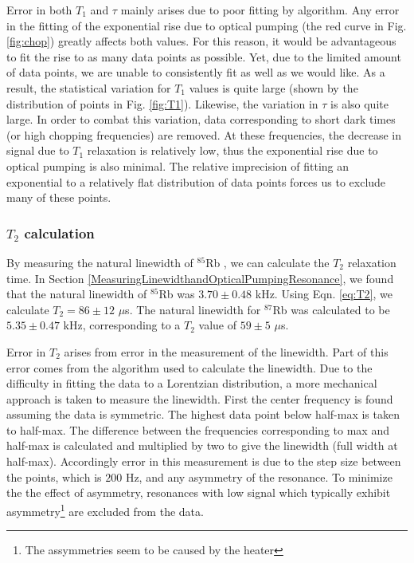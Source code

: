 Error in both $T_1$ and $\tau$ mainly arises due to poor fitting by algorithm.  Any error in the fitting of the exponential rise due to optical pumping (the red curve in Fig. \ref{fig:chop}) greatly affects both values.  For this reason, it would be advantageous to fit the rise to as many data points as possible. Yet, due to the limited amount of data points, we are unable to consistently fit as well as we would like.  As a result, the statistical variation for $T_1$ values is quite large (shown by the distribution of points in Fig. \ref{fig:T1}). Likewise, the variation in $\tau$ is also quite large.  In order to combat this variation, data corresponding to short dark times (or high chopping frequencies) are removed.  At these frequencies, the decrease in signal due to $T_1$ relaxation is relatively low, thus the exponential rise due to optical pumping is also minimal.  The relative imprecision of fitting an exponential to a relatively flat distribution of data points forces us to exclude many of these points.

\subsubsection{$T_{2}$ calculation}

By measuring the natural linewidth of $^{85}$Rb , we can calculate the $T_2$ relaxation time.  In Section \ref{MeasuringLinewidthandOpticalPumpingResonance}, we found that the natural linewidth of $^{85}$Rb was $3.70 \pm 0.48$ kHz.  Using Eqn. \ref{eq:T2}, we calculate $T_2 = 86 \pm 12$ $\mu$s. The natural linewidth for $^{87}$Rb was calculated to be $5.35 \pm 0.47$ kHz, corresponding to a $T_2$ value of  $59 \pm 5$ $\mu$s.

Error in $T_2$ arises from error in the measurement of the linewidth. Part of this error comes from the algorithm used to calculate the linewidth.  Due to the difficulty in fitting the data to a Lorentzian distribution, a more mechanical approach is taken to measure the linewidth. First the center frequency is found assuming  the data is symmetric. The highest data point below half-max is taken to half-max.  The difference between the frequencies corresponding to max and half-max is calculated and multiplied by two to give the linewidth (full width at half-max).  Accordingly error in this measurement is due to the step size between the points, which is $200$ Hz, and  any asymmetry of the resonance.  To minimize the the effect of asymmetry, resonances with low signal which typically exhibit asymmetry\footnote{The assymmetries seem to be caused by the heater} are excluded from the data. 

